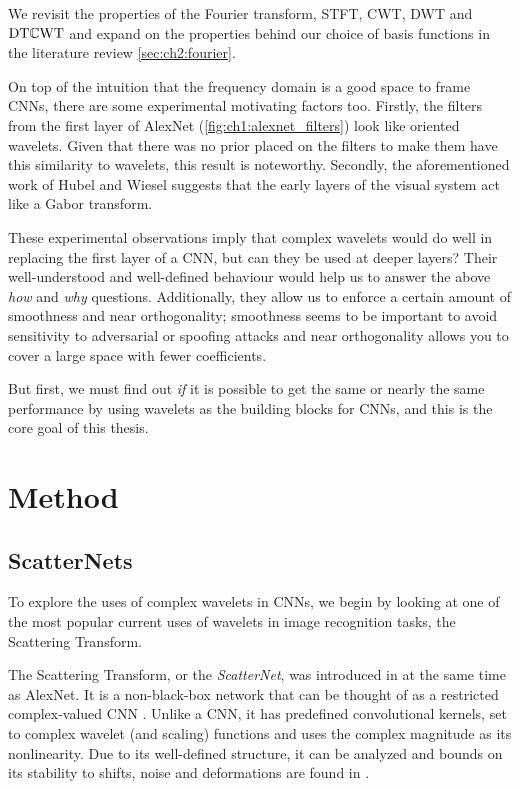 We revisit the properties of the Fourier transform, STFT, CWT, DWT and $\mathrm{DT}\mathbb{C}\mathrm{WT}$
and expand on the properties behind our choice of basis functions 
in the literature review \autoref{sec:ch2:fourier}.

On top of the intuition that the frequency domain is a good space to frame CNNs,
there are some experimental motivating factors too. Firstly, the filters from
the first layer of AlexNet (\autoref{fig:ch1:alexnet_filters}) look like
oriented wavelets. Given that there was no prior placed on the filters to make
them have this similarity to wavelets, this result is noteworthy. Secondly, the
aforementioned work of Hubel and Wiesel suggests that the early layers of the
visual system act like a Gabor transform.

These experimental observations imply that complex wavelets would do well in
replacing the first layer of a CNN, but can they be used at deeper layers? Their
well-understood and well-defined behaviour would help us to answer the above
\emph{how} and \emph{why} questions. Additionally, they allow us to enforce a
certain amount of smoothness and near orthogonality; smoothness seems to be
important to avoid sensitivity to adversarial or spoofing attacks
\cite{szegedy_intriguing_2014} and near orthogonality allows you to cover a
large space with fewer coefficients.

But first, we must find out \emph{if} it is possible to get the same or nearly the same
performance by using wavelets as the building blocks for CNNs, and this is the
core goal of this thesis. 

\section{Method}
\subsection{ScatterNets}
To explore the uses of complex wavelets in CNNs, we begin by looking at one of the most
popular current uses of wavelets in image recognition tasks, the
Scattering Transform. 

The Scattering Transform, or the \emph{ScatterNet}, was introduced in \cite{mallat_group_2012,
bruna_invariant_2013} at the same time as AlexNet. It is a non-black-box
network that can be thought of as a restricted complex-valued CNN
\cite{bruna_mathematical_2015}. Unlike a CNN, it has predefined
convolutional kernels, set to complex wavelet (and scaling) functions and uses
the complex magnitude as its nonlinearity. Due to
its well-defined structure, it can be analyzed and bounds on its stability to 
shifts, noise and deformations are found in \cite{mallat_group_2012}.
%

